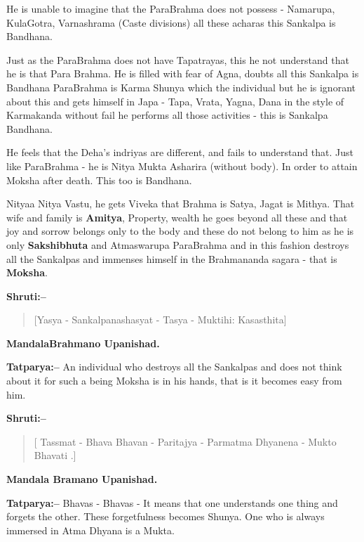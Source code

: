 He is unable to imagine that the ParaBrahma does not possess - Namarupa, KulaGotra, Varnashrama (Caste divisions) all these acharas this Sankalpa is Bandhana. 

Just as the ParaBrahma does not have Tapatrayas, this he not understand that he is that Para Brahma. He is filled with fear of Agna, doubts all this Sankalpa is Bandhana ParaBrahma is Karma Shunya which the individual but he is ignorant about this and gets himself in Japa - Tapa, Vrata, Yagna, Dana in the style of Karmakanda without fail he performs all those activities - this is Sankalpa Bandhana.

He feels that the Deha's indriyas are different, and fails to understand that. Just like ParaBrahma - he is Nitya Mukta Asharira (without body). In order to attain Moksha after death. This too is Bandhana.

Nityaa Nitya Vastu, he gets Viveka that Brahma is Satya, Jagat is Mithya. That wife and family is \textbf{Amitya}, Property, wealth he goes beyond all these and that joy and sorrow belongs only to the body and these do not belong to him as he is only \textbf{Sakshibhuta} and Atmaswarupa ParaBrahma and in this fashion destroys all the Sankalpas and immenses himself in the Brahmananda sagara - that is \textbf{Moksha}.

\newpage

\textbf{Shruti:–}

\begin{verse}
[Yasya - Sankalpanashasyat - Tasya - Muktihi: Kasasthita]
\end{verse}

\begin{flushright}
\textbf{MandalaBrahmano Upanishad.}
\end{flushright}

\textbf{Tatparya:–} An individual who destroys all the Sankalpas and does not think about it for such a being Moksha is in his hands, that is it becomes easy from him.

\textbf{Shruti:–}

\begin{verse}
[ Tassmat - Bhava Bhavan - Paritajya - Parmatma Dhyanena - Mukto Bhavati .]
\end{verse}

\begin{flushright}
\textbf{Mandala Bramano Upanishad.}
\end{flushright}

\textbf{Tatparya:–} Bhavas - Bhavas - It means that one understands one thing and forgets the other. These forgetfulness becomes Shunya. One who is always immersed in Atma Dhyana is a Mukta.

